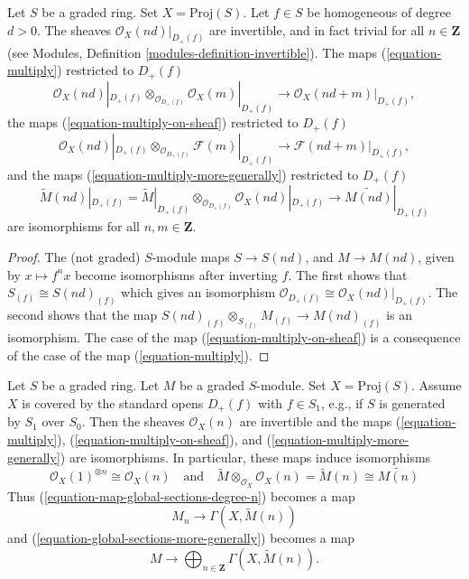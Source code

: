 \begin{lemma}
\label{lemma-when-invertible}
Let $S$ be a graded ring. Set $X = \text{Proj}(S)$.
Let $f \in S$ be homogeneous of degree $d > 0$.
The sheaves $\mathcal{O}_X(nd)|_{D_{+}(f)}$ are invertible,
and in fact trivial for all $n \in \mathbf{Z}$
(see Modules, Definition \ref{modules-definition-invertible}).
The maps (\ref{equation-multiply}) restricted to $D_{+}(f)$
$$
\mathcal{O}_X(nd)|_{D_{+}(f)} \otimes_{\mathcal{O}_{D_{+}(f)}}
\mathcal{O}_X(m)|_{D_{+}(f)}
\longrightarrow
\mathcal{O}_X(nd + m)|_{D_{+}(f)},
$$
the maps (\ref{equation-multiply-on-sheaf}) restricted to $D_+(f)$
$$
\mathcal{O}_X(nd)|_{D_{+}(f)} \otimes_{\mathcal{O}_{D_{+}(f)}}
\mathcal{F}(m)|_{D_{+}(f)}
\longrightarrow
\mathcal{F}(nd + m)|_{D_{+}(f)},
$$
and the maps (\ref{equation-multiply-more-generally})
restricted to $D_{+}(f)$
$$
\widetilde M(nd)|_{D_{+}(f)}
=
\widetilde M|_{D_{+}(f)}
\otimes_{\mathcal{O}_{D_{+}(f)}}
\mathcal{O}_X(nd)|_{D_{+}(f)}
\longrightarrow
\widetilde{M(nd)}|_{D_{+}(f)}
$$
are isomorphisms for all $n, m \in \mathbf{Z}$.
\end{lemma}

\begin{proof}
The (not graded) $S$-module maps $S \to S(nd)$, and $M \to M(nd)$, given by
$x \mapsto f^n x$ become isomorphisms after inverting $f$. The first shows that
$S_{(f)} \cong S(nd)_{(f)}$ which gives an isomorphism
$\mathcal{O}_{D_{+}(f)} \cong \mathcal{O}_X(nd)|_{D_{+}(f)}$.
The second shows that the map
$S(nd)_{(f)} \otimes_{S_{(f)}} M_{(f)} \to M(nd)_{(f)}$
is an isomorphism. The case of the map (\ref{equation-multiply-on-sheaf})
is a consequence of the case of the map (\ref{equation-multiply}).
\end{proof}

\begin{lemma}
\label{lemma-apply-modules}
Let $S$ be a graded ring. Let $M$ be a graded $S$-module.
Set $X = \text{Proj}(S)$. Assume $X$ is covered by the standard
opens $D_+(f)$ with $f \in S_1$, e.g., if $S$ is generated by $S_1$
over $S_0$. Then the sheaves $\mathcal{O}_X(n)$
are invertible and the maps
(\ref{equation-multiply}), (\ref{equation-multiply-on-sheaf}), and
(\ref{equation-multiply-more-generally}) are isomorphisms.
In particular, these maps induce isomorphisms
$$
\mathcal{O}_X(1)^{\otimes n} \cong
\mathcal{O}_X(n)
\quad
\text{and}
\quad
\widetilde{M} \otimes_{\mathcal{O}_X} \mathcal{O}_X(n) =
\widetilde{M}(n) \cong \widetilde{M(n)}
$$
Thus (\ref{equation-map-global-sections-degree-n}) becomes a map
\begin{equation}
\label{equation-map-global-sections-degree-n-simplified}
M_n \longrightarrow \Gamma(X, \widetilde{M}(n))
\end{equation}
and (\ref{equation-global-sections-more-generally}) becomes a map
\begin{equation}
\label{equation-global-sections-more-generally-simplified}
M \longrightarrow
\bigoplus\nolimits_{n \in \mathbf{Z}} \Gamma(X, \widetilde{M}(n)).
\end{equation}
\end{lemma}

